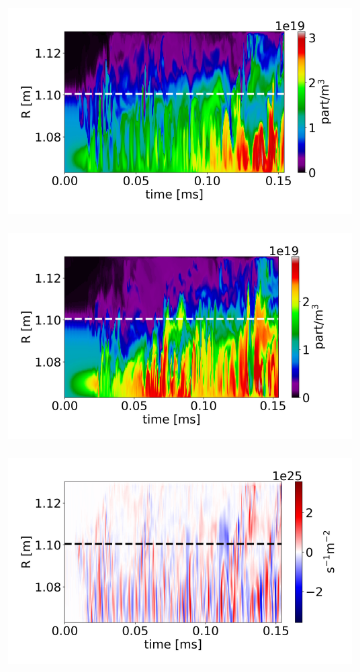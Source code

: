 \begin{figure}[H]\centering
	\begin{subfigure}[t]{0.45\textwidth}
		\centering
		\includegraphics[width=1\textwidth]{schemes/plotOMPtime_spec1_n_PHIAJ_beta_1.jpg}
	\end{subfigure}
	\begin{subfigure}[t]{0.45\textwidth}
		\centering
		\includegraphics[width=1\textwidth]{schemes/plotOMPtime_spec1_n_flutter.jpg}
	\end{subfigure}
	\begin{subfigure}[t]{0.45\textwidth}
		\centering
		\includegraphics[width=1\textwidth]{schemes/plotOMPtime_spec1_fluxn_psi_PHIAJ_beta_1.jpg}

\end{subfigure}
\end{figure}
